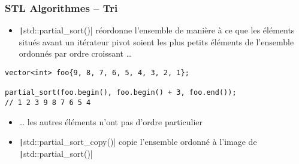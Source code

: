 \documentclass[C++.tex]{subfiles}
\begin{document}
\begin{frame}[fragile]
	\frametitle{STL Algorithmes -- Tri}
	\begin{itemize}
		\item \texttt|std::partial_sort()| réordonne l'ensemble de manière à ce que les éléments situés avant un itérateur pivot soient les plus petits éléments de l'ensemble ordonnés par ordre croissant \ldots{}
	\end{itemize}

	\begin{verbatim}
vector<int> foo{9, 8, 7, 6, 5, 4, 3, 2, 1};

partial_sort(foo.begin(), foo.begin() + 3, foo.end());
// 1 2 3 9 8 7 6 5 4
	\end{verbatim}

	\begin{itemize}
		\item \ldots{} les autres éléments n'ont pas d'ordre particulier
		\item \texttt|std::partial_sort_copy()| copie l'ensemble ordonné à l'image de \texttt|std::partial_sort()|
	\end{itemize}

\end{frame}
\end{document}

